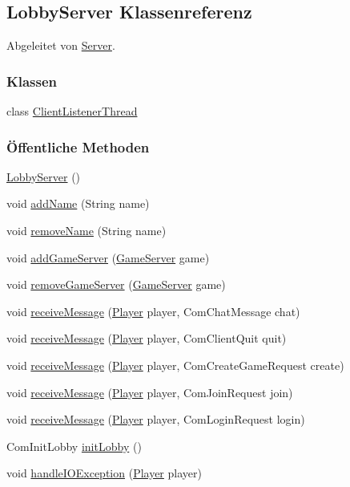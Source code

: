 \hypertarget{a00074}{\subsection{Lobby\-Server Klassenreferenz}
\label{a00074}
}


Abgeleitet von \hyperlink{a00077}{Server}.

\subsubsection*{Klassen}
\begin{DoxyCompactItemize}
\item 
class \hyperlink{a00075}{Client\-Listener\-Thread}
\end{DoxyCompactItemize}
\subsubsection*{Öffentliche Methoden}
\begin{DoxyCompactItemize}
\item 
\hypertarget{a00074_a5f653627fffd8dae2f05d3200af27eb4}{\hyperlink{a00074_a5f653627fffd8dae2f05d3200af27eb4}{Lobby\-Server} ()}\label{a00074_a5f653627fffd8dae2f05d3200af27eb4}

\item 
void \hyperlink{a00074_a6cb6626c1394ab28197a8e37e438f135}{add\-Name} (String name)
\item 
void \hyperlink{a00074_a490421d42a54dd3dfeae133911b3f1ff}{remove\-Name} (String name)
\item 
void \hyperlink{a00074_a458349fade31bd4bcdcff8062e6bbe52}{add\-Game\-Server} (\hyperlink{a00072}{Game\-Server} game)
\item 
void \hyperlink{a00074_a35c0370a78b39c5af3f1eb58f42b557f}{remove\-Game\-Server} (\hyperlink{a00072}{Game\-Server} game)
\item 
void \hyperlink{a00074_a35ab43e0cc0ed85898cf687d29d79d82}{receive\-Message} (\hyperlink{a00076}{Player} player, Com\-Chat\-Message chat)
\item 
void \hyperlink{a00074_a9d96ab623d7989576a1d610ec6efe98a}{receive\-Message} (\hyperlink{a00076}{Player} player, Com\-Client\-Quit quit)
\item 
void \hyperlink{a00074_af5c4ce98894b888dbe2e2be9880251fe}{receive\-Message} (\hyperlink{a00076}{Player} player, Com\-Create\-Game\-Request create)
\item 
void \hyperlink{a00074_ab084eaa9529b43f3f78c47409c9bf506}{receive\-Message} (\hyperlink{a00076}{Player} player, Com\-Join\-Request join)
\item 
void \hyperlink{a00074_a8eb007ea65d492970bb91876da536e60}{receive\-Message} (\hyperlink{a00076}{Player} player, Com\-Login\-Request login)
\item 
Com\-Init\-Lobby \hyperlink{a00074_a93ac02d4365254caccd4388d262160df}{init\-Lobby} ()
\item 
void \hyperlink{a00074_af3ddb51daa156429385870eb04bd456e}{handle\-I\-O\-Exception} (\hyperlink{a00076}{Player} player)
\end{DoxyCompactItemize}
